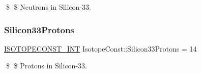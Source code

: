 \$ \$ Neutrons in Silicon-\/33. \mbox{\label{group___isotope_const-_silicon-_si33_ga2e9cc4eeeb9729c68bce8f634eb86fcf}} 
\subsubsection{\texorpdfstring{Silicon33\+Protons}{Silicon33Protons}}
{\footnotesize\ttfamily \mbox{\hyperlink{group___isotope_const-_macros_ga5f18360b3e99483a35c32d789e62621c}{I\+S\+O\+T\+O\+P\+E\+C\+O\+N\+S\+T\+\_\+\+I\+NT}} Isotope\+Const\+::\+Silicon33\+Protons = 14}

\$ \$ Protons in Silicon-\/33. 